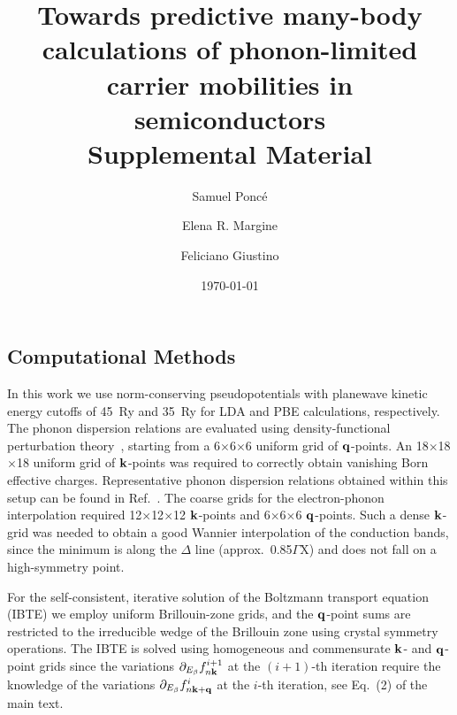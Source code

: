 \documentclass[aps,prl,twocolumn,superscriptaddress]{revtex4-1}
\begin{document}
\title{Towards predictive many-body calculations of phonon-limited carrier mobilities in semiconductors\\[6pt]
Supplemental Material}

\author{Samuel Ponc\'e}
\author{Elena R. Margine}
\author{Feliciano Giustino}

\newcommand{\mobun}{{cm$^2$/Vs}}
\renewcommand{\thetable}{S\arabic{table}}
\renewcommand{\thefigure}{S\arabic{figure}}
\def\a{{\alpha}}
\def\b{{\beta}}
\def\ve{{\varepsilon}}
\def\w{\omega}
\def\bk{{\bf k}}
\def\bq{{\bf q}}
\def\bG{{\bf G}}
\def\d{\delta}
\def\>{\rangle}
\def\<{\langle}
\def\D{\partial}
\def\kt{k_{\rm B}T}
\def\hbp{{\hat{\bf p}}}

\date{\today}

\maketitle

\subsection{Computational Methods}

In this work we use norm-conserving pseudopotentials with planewave kinetic energy cutoffs of 45~Ry 
and 35~Ry for LDA and PBE calculations, respectively. The phonon dispersion relations are evaluated
using density-functional perturbation theory~\cite{Baroni2001}, starting from a 
6$\times$6$\times$6 uniform grid of $\bq$-points. An 18$\times$18$\times$18 uniform grid of $\bk$-points 
was required to correctly obtain vanishing Born effective charges.
Representative phonon dispersion relations obtained
within this setup can be found in Ref.~\cite{Ponce2016a}. 
The coarse grids for the electron-phonon interpolation required 12$\times$12$\times$12 $\bk$-points and 
6$\times$6$\times$6 $\bq$-points. Such a dense $\bk$-grid was needed to obtain a good Wannier interpolation
of the conduction bands, since the minimum is along the $\Delta$ line (approx.~0.85$\Gamma$X) 
and does not fall on a high-symmetry point.  


For the self-consistent, iterative solution of the Boltzmann transport equation (IBTE) we employ
uniform Brillouin-zone grids, and the $\bq$-point sums are restricted to the irreducible wedge
of the Brillouin zone using crystal symmetry operations. The IBTE is solved using homogeneous and commensurate
$\bk$- and $\bq$-point grids since the variations $\D_{E_\b} f_{n\bk}^{i+1}$ at the $(i+1)$-th
iteration require the knowledge of the variations $\D_{E_\b} f_{n\bk+\bq}^{i}$ at the $i$-th iteration,
see Eq.~(2) of the main text.
\end{document}
